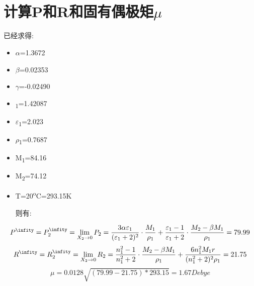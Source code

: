 \documentclass[11pt]{report}
\begin{document}
\section{计算P\textsuperscript{\infity}和R\textsuperscript{\infity}和固有偶极矩\(\mu\)}
\label{sec:org3779f48}
已经求得:
\begin{itemize}
\item \(\alpha\)=1.3672
\item \(\beta\)=0.02353
\item \(\gamma\)=-0.02490
\item \n\textsubscript{1}=1.42087
\item \(\varepsilon\)\textsubscript{1}=2.023
\item \(\rho\)\textsubscript{1}=0.7687
\item M\textsubscript{1}=84.16
\item M\textsubscript{2}=74.12
\item T=20\textsuperscript{o}C=293.15K

则有:
\end{itemize}
\[
P^{\infity}=P^{\infity}_{2}=\lim_{X_{2}\to 0}P_{2}=\frac{3\alpha\varepsilon_{1}}{(\varepsilon_{1}+2)^{2}}\cdot\frac{M_{1}}{\rho_{1}}+\frac{\varepsilon_{1}-1}{\varepsilon_{1}+2}\cdot\frac{M_{2}-\beta M_{1}}{\rho_{1}}  =79.99
\]
\[
R^{\infity}=R^{\infity}_{2}=\lim_{X_{2}\to 0}R_{2}=\frac{n_{1}^{2}-1}{n_{1}^{2}+2}\cdot\frac{M_{2}-\beta M_{1}}{\rho_{1}}+\frac{6n_{1}^{2}M_{1}r}{(n_{1}^{2}+2)^{2}\rho_{1}}=21.75
\]
\[
\mu=0.0128\sqrt{(79.99-21.75)*293.15}=1.67 Debye
\]
\end{document}
